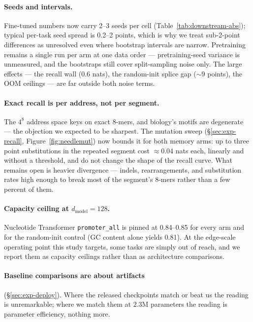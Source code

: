 \documentclass[11pt]{article}
\theoremstyle{plain}
\begin{document}
\paragraph{Seeds and intervals.} Fine-tuned numbers now carry 2--3 seeds per cell
(Table~\ref{tab:downstream-abs}); typical per-task seed spread is 0.2--2 points, which is why we
treat sub-2-point differences as unresolved even where bootstrap intervals are narrow.
Pretraining remains a single run per arm at one data order --- pretraining-seed variance is
unmeasured, and the bootstraps still cover split-sampling noise only. The large effects --- the
recall wall (0.6 nats), the random-init splice gap ($\sim$9 points), the OOM ceilings --- are
far outside both noise terms.

\paragraph{Exact recall is per address, not per segment.} The $4^8$ address space keys on exact
8-mers, and biology's motifs are degenerate --- the objection we expected to be sharpest. The
mutation sweep (\S\ref{sec:exp-recall}, Figure~\ref{fig:needlemut}) now bounds it for both memory
arms: up to three point substitutions in the repeated segment cost $\approx$0.04 nats each, linearly
and without a threshold, and do not change the shape of the recall curve. What remains open is
heavier divergence --- indels, rearrangements, and substitution rates high enough to break most
of the segment's 8-mers rather than a few percent of them.

\paragraph{Capacity ceiling at $d_{\text{model}}{=}128$.} Nucleotide Transformer
\texttt{promoter\_all} is pinned at 0.84--0.85 for every arm and for the random-init control
(GC content alone yields 0.81). At the edge-scale operating point this study targets, some
tasks are simply out of reach, and we report them as capacity ceilings rather than as architecture
comparisons.

\paragraph{Baseline comparisons are about artifacts} (\S\ref{sec:exp-deploy}). Where the
released checkpoints match or beat us the reading is unremarkable; where we match them at 2.3M
parameters the reading is parameter efficiency, nothing more.
\end{document}
